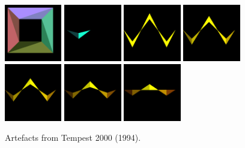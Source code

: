 \begin{figure}[H]
\includegraphics[width=2.5cm]{preface/obj2d/obj_31.png}
\includegraphics[width=2.5cm]{preface/obj2d/obj_4.png}
\includegraphics[width=2.5cm]{preface/obj2d/obj_5.png}
\includegraphics[width=2.5cm]{preface/obj2d/obj_6.png}
\includegraphics[width=2.5cm]{preface/obj2d/obj_7.png}
\includegraphics[width=2.5cm]{preface/obj2d/obj_8.png}
\includegraphics[width=2.5cm]{preface/obj2d/obj_9.png}
  \caption*{Artefacts from Tempest 2000 (1994).}
\end{figure}
\vspace*{\fill}
\thispagestyle{empty} %
\clearpage
\thispagestyle{empty} %
